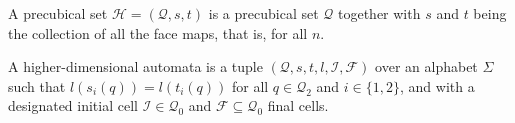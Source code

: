     
    
    
    
    
    \begin{definition}
        \label{def:higher-dimensional-automata}
        A precubical set $\mathcal{H} = (\mathcal{Q},s,t)$ is a precubical set $\mathcal{Q}$ together with $s$ and $t$ being the collection of all the face maps, that is, for all $n$. 
        
        A higher-dimensional automata is a tuple $(\mathcal{Q}, s, t, l, \mathcal{I}, \mathcal{F})$ over an alphabet $\Sigma$ such that $l(s_i(q)) = l(t_i(q))$ for all $q \in \mathcal{Q}_2$ and $i \in \{1,2\}$, and with a designated initial cell $\mathcal{I} \in \mathcal{Q}_0$ and $\mathcal{F} \subseteq \mathcal{Q}_0$ final cells.
        
        
    \end{definition}
    
